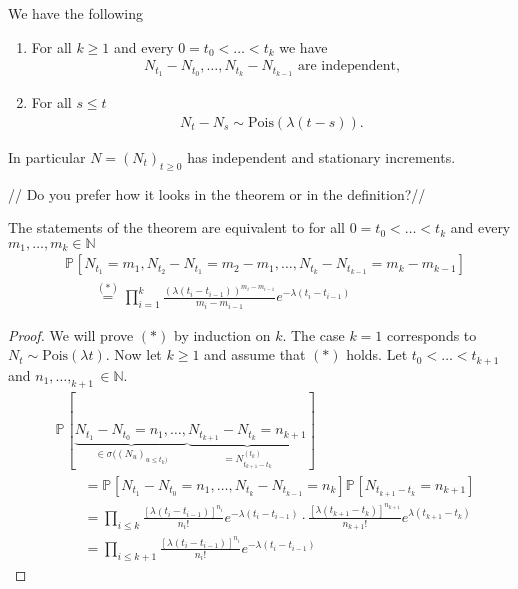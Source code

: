 \begin{theorem}
We have the following
\begin{enumerate}
	\item For all $k \geq 1$ and every $0=t_0< \ldots <t_k$ we have
		\begin{align}
		N_{t_1}-N_{t_0}, \ldots ,N_{t_k}- N_{t_{k-1}} \textrm{ are independent,}
		\end{align}
	\item For all $s \leq t$  
		\begin{align}
			N_t - N_s \sim \textrm{Pois}(\lambda (t-s)).
		\end{align}
\end{enumerate}
In particular $N=(N_t)_{t\geq 0}$ has independent and stationary increments.
\end{theorem}
{\color{blue} // Do you prefer how it looks in the theorem or in the definition?//}
\begin{rmk}[]
The statements of the theorem are equivalent to for all $0=t_0 < \ldots < t_k $ and every $m_1, \ldots ,m_k \in \mathbb{N}$ 
\begin{align}
	&	\mathbb{P}_{} \left[ N_{t_1}=m_1, N_{t_2}-N_{t_1}=m_2 - m_1, \ldots , N_{t_k}-N_{t_{k-1}}=m_k - m_{k-1} \right] \\ 
	&\qquad \stackrel{(*)}{=} \prod_{i=1}^{k}\frac{(\lambda (t_i - t_{i-1}))^{m_i-m_{i-1}}}{m_i - m_{i-1}} e^{- \lambda (t_i - t_{i-1})}
\end{align}
\end{rmk}
\begin{proof}
	We will prove $(*)$ by induction on $k$. The case $k=1$ corresponds to $N_t \sim \textrm{Pois}(\lambda t)$. Now let $k\geq 1$ and assume that $(*)$ holds. Let $t_0<\ldots<t_{k+1}$ and  $n_1,\ldots ,_{k+1} \in \mathbb{N}$.
	\begin{align}
		&\mathbb{P}_{} \left[ \underbrace{N_{t_1} - N_{t_0} = n_1, \ldots ,}_{\in \sigma((N_{u})_{u\leq t_k )}} \underbrace{N_{t_{k+1}} - N_{t_k}=n_{k+1}}_{=N_{t_{k+1}-t_{k}}^{(t_k)}} \right]  \\
		&\qquad =\mathbb{P}_{} \left[ N_{t_1} - N_{t_0} = n_1, \ldots , N_{t_k} - N_{t_{k-1}}=n_k \right] \mathbb{P}_{} \left[ N_{t_{k+1} - t_k}=n_{k+1} \right] \\
		&\qquad =\prod_{i\leq k} \frac{[\lambda (t_i - t_{i-1})]^{n_i}}{n_i!}e^{-\lambda (t_i - t_{i-1})} \cdot \frac{[\lambda (t_{k+1} - t_k) ]^{n_{k+1}}}{n_{k+1}!} e^{\lambda (t_{k+1} - t_k)}\\ 
		&\qquad =\prod_{i\leq k+1} \frac{[\lambda (t_i - t_{i-1})]^{n_i}}{n_i!}e^{-\lambda (t_i - t_{i-1})}
	\end{align}

	
\end{proof}


